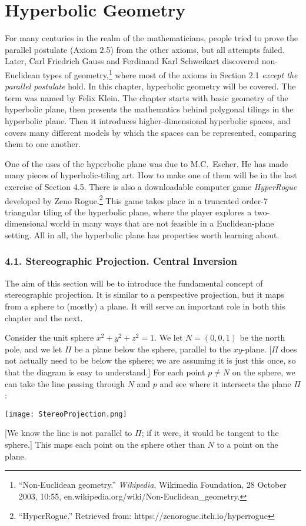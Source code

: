 \documentclass[leqno]{book}
\begin{document}
\chapter{Hyperbolic Geometry}

For many centuries in the realm of the mathematicians, people tried to prove the parallel postulate (Axiom 2.5) from the other axioms, but all attempts failed.  Later, Carl Friedrich Gauss and Ferdinand Karl Schweikart discovered non-Euclidean types of geometry,\footnote{``Non-Euclidean geometry.'' \emph{Wikipedia}, Wikimedia Foundation, 28 October 2003, 10:55, en.wikipedia.org/wiki/Non-Euclidean\_geometry.} where most of the axioms in Section 2.1 \emph{except the parallel postulate} hold.  In this chapter, hyperbolic geometry will be covered.  The term was named by Felix Klein.  The chapter starts with basic geometry of the hyperbolic plane, then presents the mathematics behind polygonal tilings in the hyperbolic plane.  Then it introduces higher-dimensional hyperbolic spaces, and covers many different models by which the spaces can be represented, comparing them to one another.

One of the uses of the hyperbolic plane was due to M.C.~Escher.  He has made many pieces of hyperbolic-tiling art.  How to make one of them will be in the last exercise of Section 4.5.  There is also a downloadable computer game \emph{HyperRogue} developed by Zeno Rogue.\footnote{``HyperRogue.'' Retrieved from: https://zenorogue.itch.io/hyperrogue}  This game takes place in a truncated order-7 triangular tiling of the hyperbolic plane, where the player explores a two-dimensional world in many ways that are not feasible in a Euclidean-plane setting.  All in all, the hyperbolic plane has properties worth learning about.

\subsection*{4.1. Stereographic Projection.  Central Inversion}
The aim of this section will be to introduce the fundamental concept of stereographic projection.  It is similar to a perspective projection, but it maps from a sphere to (mostly) a plane.  It will serve an important role in both this chapter and the next.

Consider the unit sphere $x^2+y^2+z^2=1$.  We let $N=(0,0,1)$ be the north pole, and we let $\Pi$ be a plane below the sphere, parallel to the $xy$-plane.  [$\Pi$ does not actually need to be below the sphere; we are assuming it is just this once, so that the diagram is easy to understand.]  For each point $p\ne N$ on the sphere, we can take the line passing through $N$ and $p$ and see where it intersects the plane $\Pi$:
\begin{center}\texttt{[image: StereoProjection.png]}\end{center}
[We know the line is not parallel to $\Pi$; if it were, it would be tangent to the sphere.]  This maps each point on the sphere other than $N$ to a point on the plane.
\end{document}
